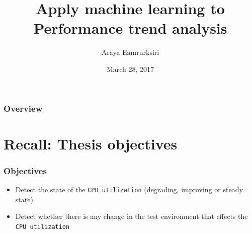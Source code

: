 \documentclass{beamer}
\title[Midterm report]{Apply machine learning to Performance trend analysis} %
\author{Araya Eamrurksiri} %
\institute[] %
{
 \\ %
\medskip
\textit{} %
}
\date{March 28, 2017} %
\begin{document}
\begin{frame}
\titlepage %
\end{frame}

\begin{frame}
\frametitle{Overview} %
\tableofcontents %
\end{frame}


\section{Recall: Thesis objectives}
\begin{frame}
\frametitle{Objectives}
\begin{itemize}
	\item Detect the state of the \texttt{CPU utilization} (degrading, improving or steady state)
	\item Detect whether there is any change in the test environment that effects the \texttt{CPU utilization}
\end{itemize}
\end{frame}

\end{document}
